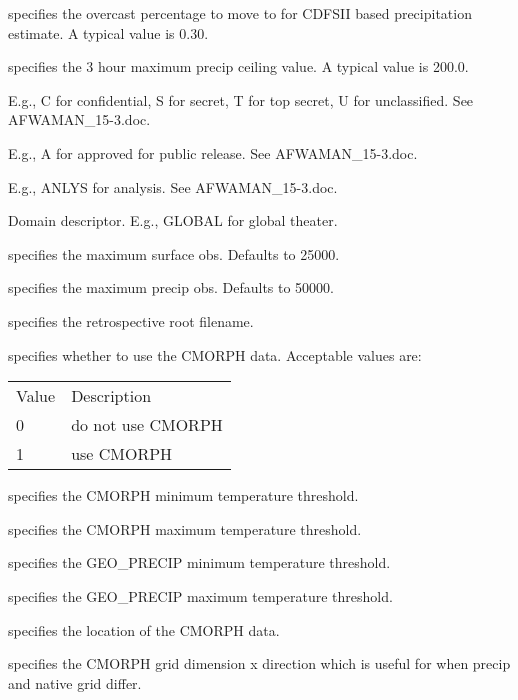   specifies the overcast percentage 
 to move to for CDFSII based precipitation estimate. A typical value
 is 0.30.

  specifies the 3 hour
 maximum precip ceiling value. A typical value is 200.0.

  E.g., C for confidential,
 S for secret, T for top secret, U for unclassified.
 See AFWAMAN\_15-3.doc.

  E.g., A for approved
 for public release.  See AFWAMAN\_15-3.doc.

  E.g., ANLYS for analysis.
 See AFWAMAN\_15-3.doc.

  Domain descriptor.  E.g., GLOBAL
 for global theater.

  specifies the maximum surface obs.
 Defaults to 25000.

  specifies the maximum precip obs.
 Defaults to 50000.

  specifies the retrospective
 root filename.

  specifies whether to use 
 the CMORPH data. 
 Acceptable values are:

 \begin{tabular}{ll}
 Value & Description                   \\
 0     & do not use CMORPH             \\
 1     & use CMORPH                    \\
 \end{tabular}

  specifies the 
 CMORPH minimum temperature threshold.

  specifies the 
 CMORPH maximum temperature threshold.

  specifies the 
 GEO\_PRECIP minimum temperature threshold.

  specifies the 
 GEO\_PRECIP maximum temperature threshold.

  specifies the location of the 
 CMORPH data.

  specifies the CMORPH grid dimension
 x direction which is useful for when precip and native grid differ.

